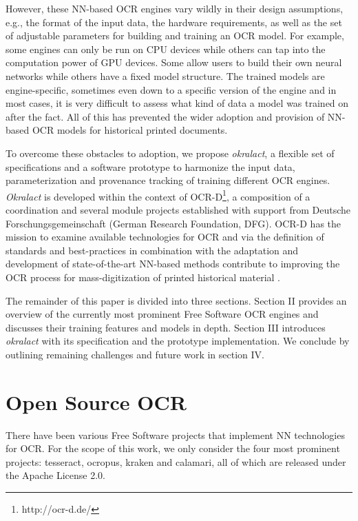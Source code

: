 \documentclass[sigconf]{acmart}
\begin{document}

However, these NN-based OCR engines vary wildly in their design
assumptions, e.g., the format of the input data, the hardware
requirements, as well as the set of adjustable parameters for
building and training an OCR model. For example, some engines can
only be run on CPU devices while others can tap into the
computation power of GPU devices. Some allow users to build their
own neural networks while others have a fixed model structure. The
trained models are engine-specific, sometimes even down to a specific
version of the engine and in most cases, it is very difficult to
assess what kind of data a model was trained on after the fact. All
of this has prevented the wider adoption and provision of NN-based 
OCR models for historical printed documents.

To overcome these obstacles to adoption, we propose
\textit{okralact}, a flexible set of specifications and a software
prototype to harmonize the input data, parameterization and
provenance tracking of training different OCR engines.
\textit{Okralact} is developed within the context of
OCR-D\footnote{http://ocr-d.de/}, a composition of a
coordination and several module projects established with support
from Deutsche Forschungsgemeinschaft (German Research Foundation,
DFG). OCR-D has the mission to examine available technologies for OCR and via the 
definition of standards and best-practices in combination with the adaptation and development of state-of-the-art NN-based methods contribute to improving the OCR process for mass-digitization of 
printed historical material \cite{neudecker2019datech}.  

The remainder of this paper is divided into three sections. Section
II provides an overview of the currently most prominent Free
Software OCR engines and discusses their training features and models 
in depth. Section III introduces \textit{okralact} with its
specification and the prototype implementation. We conclude by 
outlining remaining challenges and future work in section IV. 

\section{Open Source OCR}

There have been various Free Software projects that implement NN technologies
for OCR. For the scope of this work, we only consider the four most prominent projects: tesseract, ocropus, kraken and calamari, all of which are released under the Apache License 2.0.
\end{document}
